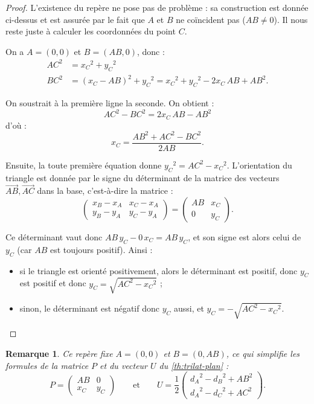 \documentclass[french, a4paper, 12pt, parskip]{scrartcl}
\newtheorem*{remark}{Remarque}
\begin{document}
\begin{proof}
  L'existence du repère ne pose pas de problème : sa construction est donnée
  ci-dessus et est assurée par le fait que $A$ et $B$ ne coïncident pas
  ($AB\not=0$). Il nous reste juste à calculer les coordonnées du point $C$.

  On a $A=(0, 0)$ et $B = (AB, 0)$, donc :
  \begin{align*}
    {AC}^2 &= {x_C}^2 + {y_C}^2 \\
    {BC}^2 &= \left(x_C-AB\right)^2 + {y_C}^2 = {x_C}^2 + {y_C}^2 - 2x_C\,AB + {AB}^2.
  \end{align*}

  On soustrait à la première ligne la seconde. On obtient :
  \[
    {AC}^2 - {BC}^2 = 2x_C\,AB - {AB}^2
  \]
  d'où :
  \[
    \boxed{x_C = \frac{{AB}^2 + {AC}^2 - {BC}^2}{2AB}}. 
  \]

  Ensuite, la toute première équation donne ${y_C}^2 = {AC}^2 - {x_C}^2$.
  L'orientation du triangle est donnée par le signe du déterminant de la matrice
  des vecteurs $\overrightarrow{AB}, \overrightarrow{AC}$ dans la base,
  c'est-à-dire la matrice :
  \[
    \begin{pmatrix}
      x_B - x_A & x_C - x_A \\
      y_B - y_A & y_C - y_A
    \end{pmatrix}
    =
    \begin{pmatrix}
      AB & x_C \\
      0 & y_C
    \end{pmatrix}.
  \]

  Ce déterminant vaut donc $AB\,y_C - 0\,x_C = AB\,y_C$, et son signe est alors
  celui de $y_C$ (car $AB$ est toujours positif). Ainsi :
  \begin{itemize}
    \item si le triangle est orienté positivement, alors le déterminant est
      positif, donc $y_C$ est positif et donc $\boxed{y_C = \sqrt{{AC}^2 -
      {x_C}^2}}$ ;
    \item sinon, le déterminant est négatif donc $y_C$ aussi, et $\boxed{y_C = -
      \sqrt{{AC}^2 - {x_C}^2}}$.\qedhere
  \end{itemize}
\end{proof}

\begin{remark}
  Ce repère fixe $A=(0, 0)$ et $B=(0, AB)$, ce qui simplifie les formules de la
  matrice $P$ et du vecteur $U$ du \autoref{th:trilat-plan} :
  \[
    P =
    \begin{pmatrix}
      AB & 0 \\
      x_C & y_C
    \end{pmatrix}\qquad\text{et}\qquad U=\frac{1}{2}\begin{pmatrix}
      {d_A}^2 - {d_B}^2 + {AB}^2 \\ 
      {d_A}^2 - {d_C}^2 + {AC}^2
    \end{pmatrix}.
  \]
\end{remark}
\end{document}
